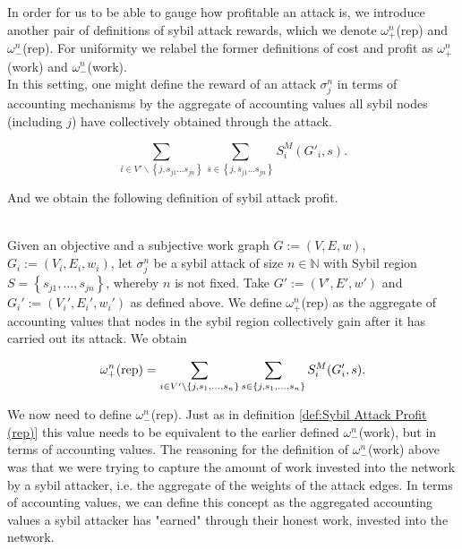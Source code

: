 \noindent{}In order for us to be able to gauge how profitable an attack is, we introduce another pair of definitions of sybil attack rewards, which we denote $\omega_{+}^{n}$(rep) and $\omega_{-}^{n}$(rep). For uniformity we relabel the former definitions of cost and profit as $\omega_{+}^{n}$(work) and $\omega_{-}^{n}$(work). \vspace{1em}\\ 

\noindent{}In this setting, one might define the reward of an attack $\sigma_j^n$ in terms of accounting mechanisms by the aggregate of accounting values all sybil nodes (including $j$) have collectively obtained through the attack. 

\[
\sum\limits_{i\in{}V'\backslash\left\lbrace{}j,s_{j1}\ldots{}s_{jn}\right\rbrace}\sum\limits_{s\in\left\lbrace{}j,s_{j1}\ldots{}s_{jn}\right\rbrace}S^M_i(G'_i,s).
\]

\noindent{}And we obtain the following definition of sybil attack profit.\vspace{1em}\\

\begin{definition}\ \\
\label{def:Sybil Attack Profit (rep)}
\noindent{}Given an objective and a subjective work graph $G:=(V,E,w)$, $G_i:=(V_i,E_i,w_i)$, let $\sigma_j^n$ be a sybil attack of size $n\in\mathbb{N}$ with Sybil region $S=\left\lbrace{}s_{j1},\ldots,s_{jn}\right\rbrace$, whereby $n$ is not fixed. Take $G':=(V',E',w')$ and $G_i':=(V_i',E_i',w_i')$ as defined above. We define $\omega_{+}^{n}$(rep) as the aggregate of accounting values that nodes in the sybil region collectively gain after it has carried out its attack. We obtain

\[
\omega_{+}^{n}({\rm rep}) = \sum\limits_{i\in{}V'\backslash\lbrace{}j,s_1,\ldots,s_n\rbrace}\sum\limits_{s\in\lbrace{}j,s_1,\ldots,s_n\rbrace}S^M_i(G_i',s).
\]
\end{definition}

\noindent{}We now need to define $\omega^{n}_{-}$(rep). Just as in definition \ref{def:Sybil Attack Profit (rep)} this value needs to be equivalent to the earlier defined $\omega_{-}^{n}$(work), but in terms of accounting values. The reasoning for the definition of $\omega_{-}^{n}$(work) above was that we were trying to capture the amount of work invested into the network by a sybil attacker, i.e. the aggregate of the weights of the attack edges. In terms of accounting values, we can define this concept as the aggregated accounting values a sybil attacker has "earned" through their honest work, invested into the network. \vspace{1em}\\

